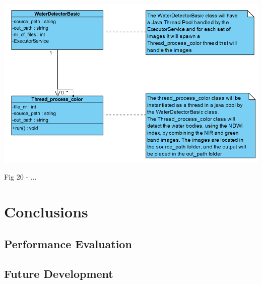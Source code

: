 \documentclass[12pt, a4paper]{report}
\begin{document}
\medskip
\includegraphics[scale=0.7, center]{WaterDetectorBasic_class.png}
\begin{center}
Fig 20 - ... 
\end{center}
\par 

\newpage



\newpage{}

\chapter{Conclusions}


\section{Performance Evaluation} 


\section{Future Development}


\renewcommand{\bibname}{Bibliography}

\end{document}
